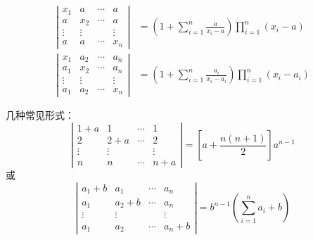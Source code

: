 \documentclass[10pt,a4paper%
tablecaptionabove]{article}
\newcommand{\cd}{\cdots}
\newcommand{\vd}{\vdots}
\begin{document}
\begin{CJK}{UTF8}{gkai}
\begin{li}
  $$
  \begin{aligned}
    \left|
      \begin{array}{cccc}
        x_1 &  a  & \cd & a   \\
        a   & x_2 & \cd & a   \\
        \vd & \vd &     & \vd \\
        a   &  a  & \cd & x_n
      \end{array}
    \right| &=   (1+\sum_{i=1}^n \frac{a}{x_i-a})\prod_{i=1}^n(x_i-a)
    \\
    \left|
      \begin{array}{cccc}
        x_1 & a_2  & \cd & a_n   \\
        a_1 & x_2 & \cd  & a_n   \\
        \vd & \vd &     & \vd \\
        a_1 & a_2  & \cd & x_n
      \end{array}
    \right| &=  (1+\sum_{i=1}^n \frac{a_i}{x_i-a_i})\prod_{i=1}^n(x_i-a_i)
  \end{aligned}
  $$          
\end{li}
\begin{zhu}
  几种常见形式：
  $$
  \left|
    \begin{array}{cccc}
      1+a &  1  & \cd & 1   \\
      2   & 2+a & \cd & 2  \\
      \vd & \vd &     & \vd \\
      n   &  n  & \cd & n+a
    \end{array}
  \right|  = \left[a+ \frac{n(n+1)}2\right]a^{n-1}
  $$
  或
  $$
  \left|
    \begin{array}{cccc}
      a_1+b & a_1   & \cd & a_n   \\
      a_1   & a_2+b & \cd  & a_n   \\
      \vd   & \vd  &     & \vd \\
      a_1   & a_2   & \cd & a_n+b
    \end{array}
  \right|  = b^{n-1}(\sum_{i=1}^na_i+b)
  $$      

\end{zhu}


\end{CJK}
\end{document}

